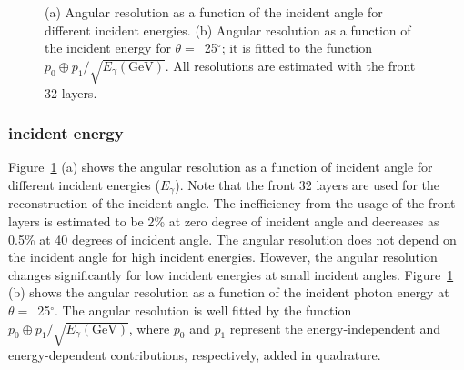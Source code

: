\documentclass[12pt,times,draftclsnofoot,a4paper]{elsarticle}
\begin{document}
\begin{figure}[!hbt]
\centering
{}
\caption{ (a) Angular resolution as a function of the incident angle for different incident energies. (b) Angular resolution as a function of the incident energy for $\theta=$~25$^{\circ}$; it is fitted to the function $p_{0} \oplus p_{1}/\sqrt{E_{\gamma}(\mathrm{GeV})}$. All resolutions are estimated with the front 32 layers. }
\label{fig:angle_reco_dep_gr}
\end{figure}

\subsubsection{incident energy}
Figure~\ref{fig:angle_reco_dep_gr} (a) shows the angular resolution as a function of incident angle for different incident energies ($E_{\gamma}$). Note that the front 32 layers are used for the reconstruction of the incident angle. The inefficiency from the usage of the front layers is estimated to be 2\% at zero degree of incident angle and decreases as 0.5\% at 40 degrees of incident angle. The angular resolution does not depend on the incident angle for high incident energies. However, the angular resolution changes significantly for low incident energies at small incident angles. Figure~\ref{fig:angle_reco_dep_gr} (b) shows the angular resolution as a function of the incident photon energy at $\theta=$~25$^{\circ}$. The angular resolution is well fitted by the function $p_{0} \oplus p_{1}/\sqrt{E_{\gamma}(\mathrm{GeV})}$, where $p_{0}$ and $p_{1}$ represent the energy-independent and energy-dependent contributions, respectively, added in quadrature.
\end{document}
